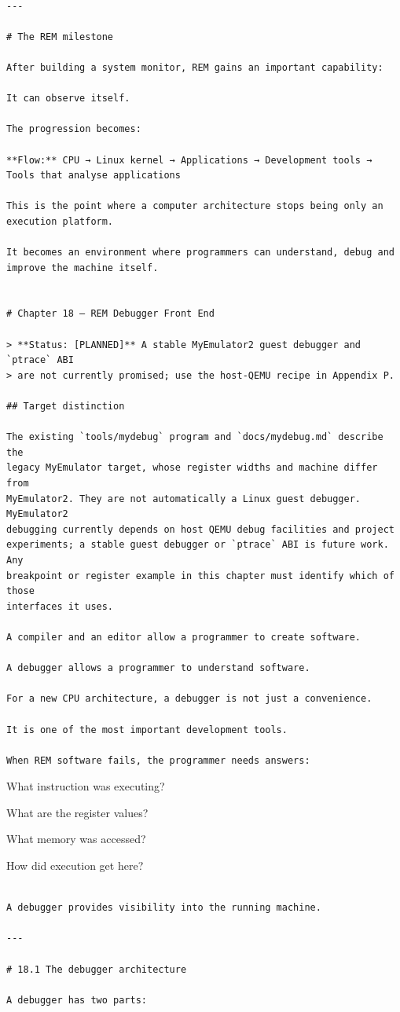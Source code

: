 \documentclass[
  oneside,
  openany]{book}
\begin{document}
\begin{verbatim}

---

# The REM milestone

After building a system monitor, REM gains an important capability:

It can observe itself.

The progression becomes:

**Flow:** CPU → Linux kernel → Applications → Development tools → Tools that analyse applications

This is the point where a computer architecture stops being only an execution platform.

It becomes an environment where programmers can understand, debug and improve the machine itself.


# Chapter 18 — REM Debugger Front End

> **Status: [PLANNED]** A stable MyEmulator2 guest debugger and `ptrace` ABI
> are not currently promised; use the host-QEMU recipe in Appendix P.

## Target distinction

The existing `tools/mydebug` program and `docs/mydebug.md` describe the
legacy MyEmulator target, whose register widths and machine differ from
MyEmulator2. They are not automatically a Linux guest debugger. MyEmulator2
debugging currently depends on host QEMU debug facilities and project
experiments; a stable guest debugger or `ptrace` ABI is future work. Any
breakpoint or register example in this chapter must identify which of those
interfaces it uses.

A compiler and an editor allow a programmer to create software.

A debugger allows a programmer to understand software.

For a new CPU architecture, a debugger is not just a convenience.

It is one of the most important development tools.

When REM software fails, the programmer needs answers:
\end{verbatim}

What instruction was executing?

What are the register values?

What memory was accessed?

How did execution get here?

\begin{verbatim}

A debugger provides visibility into the running machine.

---

# 18.1 The debugger architecture

A debugger has two parts:
\end{verbatim}
\end{document}
